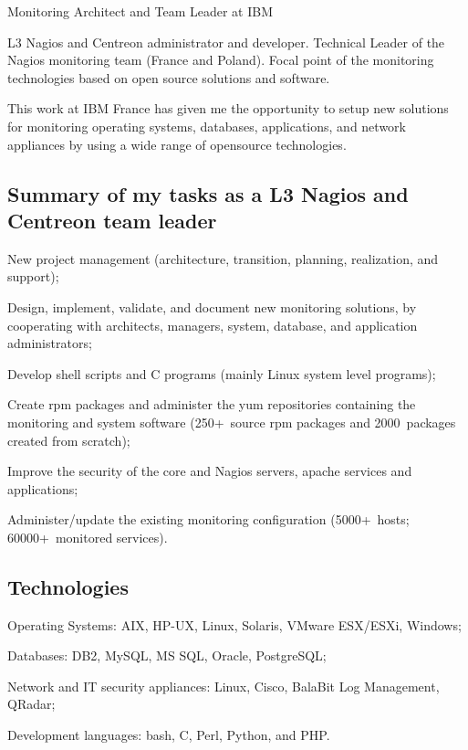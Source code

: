 
\bigskip
{}
{Monitoring Architect and Team Leader at IBM}

\noindent
L3 Nagios and Centreon administrator and developer.
Technical Leader of the Nagios monitoring team (France and Poland).
Focal point of the monitoring technologies based on open source solutions and
software.

This work at IBM France has given me the opportunity to setup new solutions 
for monitoring operating systems, databases, applications, and network 
appliances by using a wide range of opensource technologies.

\subsection{Summary of my tasks as a L3 Nagios and Centreon team leader}

\item{\bdot} New project management (architecture, transition, planning, 
   realization, and support);
\item{\bdot} Design, implement, validate, and document new monitoring solutions,
   by cooperating with architects, managers, system, database, and application 
   administrators;
\item{\bdot} Develop shell scripts and C programs (mainly Linux system level
   programs);
\item{\bdot} Create rpm packages and administer the yum repositories containing
   the monitoring and system software (250+~source rpm packages and  
   2000~packages created from scratch);
\item{\bdot} Improve the security of the core and Nagios servers, apache 
   services and applications;
\item{\bdot} Administer/update the existing monitoring configuration 
   (5000+~hosts; 60000+~monitored services).

\subsection{Technologies}

\item{\bdot} Operating Systems: AIX, HP-UX, Linux, Solaris, VMware ESX/ESXi, Windows;
\item{\bdot} Databases: DB2, MySQL, MS SQL, Oracle, PostgreSQL;
\item{\bdot} Network and IT security appliances: Linux, Cisco, BalaBit Log Management, 
   QRadar;
\item{\bdot} Development languages: bash, C, Perl, Python, and PHP.

